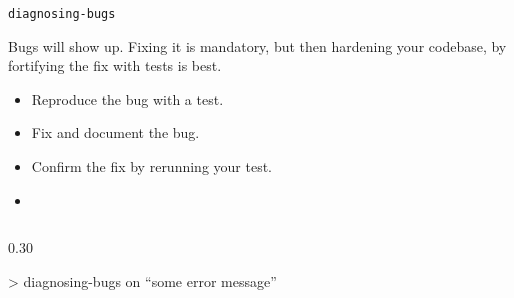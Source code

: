 \begin{frame}{\texttt{diagnosing-bugs}}
  \begin{withmargin}
    \begin{tdmain}
      Bugs will show up. Fixing it is mandatory, but then 
      hardening your codebase, by fortifying the fix with tests is best.
      \begin{itemize}\itemsep4pt
        \item Reproduce the bug with a test.
        \item Fix and document the bug.
        \item Confirm the fix by rerunning your test.
        \item {}
      \end{itemize}
    \end{tdmain}
    \begin{column}{0.30\textwidth}
      \begin{tdblock}
        {\ttfamily\small
        > diagnosing-bugs on ``some error message''}
      \end{tdblock}
    \end{column}
  \end{withmargin}
\end{frame}

